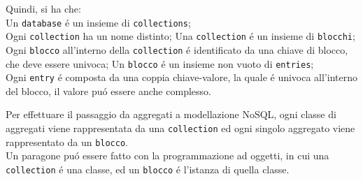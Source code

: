 Quindi, si ha che:\\
Un \texttt{database} é un insieme di \texttt{collections};\\
Ogni \texttt{collection} ha un nome distinto; Una \texttt{collection} é un insieme di \texttt{blocchi};\\
Ogni \texttt{blocco} all'interno della \texttt{collection} é identificato da una chiave di blocco, che deve essere univoca;
Un \texttt{blocco} é un insieme non vuoto di \texttt{entries};\\
Ogni \texttt{entry} é composta da una coppia chiave-valore, la quale é univoca all'interno del blocco, il valore puó essere anche complesso.

Per effettuare il passaggio da aggregati a modellazione NoSQL, ogni classe di aggregati viene rappresentata da una \texttt{collection} ed
ogni singolo aggregato viene rappresentato da un \texttt{blocco}.\\
Un paragone puó essere fatto con la programmazione ad oggetti, in cui una \texttt{collection} é
una classe, ed un \texttt{blocco} é l'istanza di quella classe.

